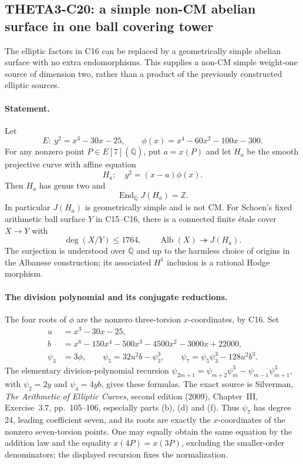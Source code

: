 \documentclass[11pt]{article}
\newcommand{\Q}{\mathbb Q}\newcommand{\C}{\mathbb C}\newcommand{\Z}{\mathbb Z}\newcommand{\R}{\mathbb R}\newcommand{\A}{\mathbb A}\newcommand{\OO}{\mathcal O}
\theoremstyle{definition}\newtheorem{definition}[theorem]{Definition}\newtheorem{remark}[theorem]{Remark}
\begin{document}
\subsection{THETA3-C20: a simple non-CM abelian surface in one ball covering tower}\label{C20}

The elliptic factors in C16 can be replaced by a geometrically
simple abelian surface with no extra endomorphisms. This supplies a
non-CM simple weight-one source of dimension two, rather than a
product of the previously constructed elliptic sources.

\paragraph{Statement.}
Let
\[
 E:\ y^2=x^3-30x-25,\qquad
 \phi(x)=x^4-60x^2-100x-300.
\]
For any nonzero point $P\in E[7](\overline{\Q})$, put $a=x(P)$
and let $H_a$ be the smooth projective curve with affine equation
\[
 H_a:\quad y^2=(x-a)\phi(x).
 \tag{C20a}
\]
Then $H_a$ has genus two and
\[
 \operatorname{End}_{\overline{\Q}}J(H_a)=\Z.
 \tag{C20b}
\]
In particular $J(H_a)$ is geometrically simple and is not CM.
For Schoen's fixed arithmetic ball surface $Y$ in C15--C16, there
is a connected finite \'etale cover $X\to Y$ with
\[
 \deg(X/Y)\leq1764,\qquad
 \operatorname{Alb}(X)\twoheadrightarrow J(H_a).
 \tag{C20c}
\]
The surjection is understood over $\overline{\Q}$ and up to the
harmless choice of origins in the Albanese construction; its
associated $H^1$ inclusion is a rational Hodge morphism.

\paragraph{The division polynomial and its conjugate reductions.}
The four roots of $\phi$ are the nonzero three-torsion
$x$-coordinates, by C16. Set
\begin{align*}
 u&=x^3-30x-25,\\
 b&=x^6-150x^4-500x^3-4500x^2-3000x+22000,\\
 \psi_3&=3\phi,\qquad
 \psi_5=32u^2b-\psi_3^3,\qquad
 \psi_7=\psi_5\psi_3^3-128u^2b^3.
\end{align*}
The elementary division-polynomial recursion
$\psi_{2m+1}=\psi_{m+2}\psi_m^3-
\psi_{m-1}\psi_{m+1}^3$, with $\psi_2=2y$ and
$\psi_4=4yb$, gives these formulas. The exact source is
Silverman, \emph{The Arithmetic of Elliptic Curves},
second edition (2009), Chapter~III, Exercise~3.7,
pp.~105--106, especially parts (b), (d) and (f).
Thus $\psi_7$ has degree
24, leading coefficient seven, and its roots are exactly the
$x$-coordinates of the nonzero seven-torsion points.
One may equally obtain the same equation by the addition law
and the equality $x(4P)=x(3P)$, excluding the smaller-order
denominators; the displayed recursion fixes the normalization.
\end{document}
